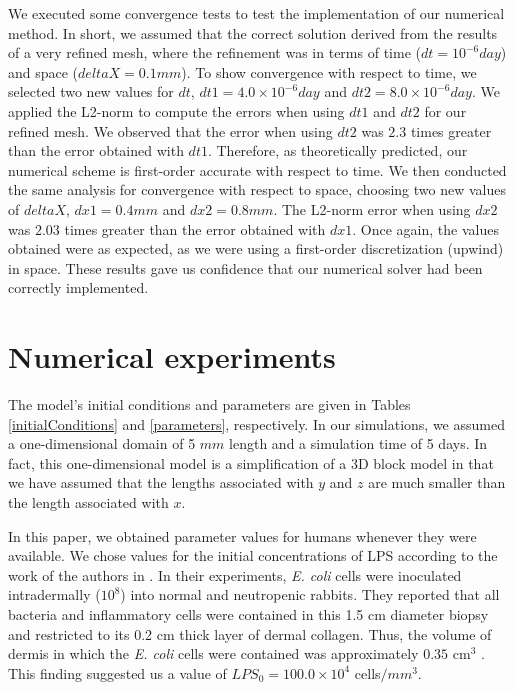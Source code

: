 \documentclass[10pt]{bmc_article}
\newenvironment{bmcformat}{\baselineskip20pt\sloppy\setboolean{publ}{false}}{\baselineskip20pt\sloppy}
\begin{document}
\begin{bmcformat}
We executed some convergence tests to test the implementation of our numerical method. 
In short, we assumed that the correct solution derived from the results of a very refined mesh, where the refinement was in terms of 
time ($dt = 10^{-6} day$) and space ($deltaX = 0.1 mm$). To show convergence with respect to time, we selected two new values for 
$dt$, $dt1 = 4.0 \times 10^{-6} day$ and $dt2 = 8.0 \times 10^{-6} day$. We applied the L2-norm to compute the errors when using 
$dt1$ and $dt2$ for our refined mesh. We observed that the error when using $dt2$ was $2.3$ times greater than the error obtained 
with $dt1$. Therefore, as theoretically predicted, our numerical scheme is first-order accurate with respect to time. We then conducted 
the same analysis for convergence with respect to space, choosing two new values of $deltaX$, $dx1 = 0.4 mm$ and $dx2 = 0.8 mm$. 
The L2-norm error when using $dx2$ was $2.03$ times greater than the error obtained with $dx1$. Once again, the values obtained were 
as expected, as we were using a first-order discretization (upwind) in space. These results gave us confidence that our numerical 
solver had been correctly implemented.


\section*{Numerical experiments}\label{results}

The model's initial conditions and parameters are given in Tables \ref{initialConditions} and \ref{parameters}, respectively. 
In our simulations, we assumed a one-dimensional domain of 5 $mm$ length and a simulation time of 5 days. 
In fact, this one-dimensional model is a simplification of a 3D block model in that we have assumed that the lengths associated 
with $y$ and $z$ are much smaller than the length associated with $x$.

In this paper, we obtained parameter values for humans whenever they were available. 
 We chose values for the initial concentrations of LPS according to the work of the authors in \cite{Movat1986}. 
In their experiments, \textit{E. coli} cells were inoculated intradermally ($10^8$) into normal and neutropenic rabbits. 
They reported that all bacteria and inflammatory cells were contained in this 1.5 cm diameter biopsy and restricted to its 0.2 cm 
thick layer of dermal collagen. Thus, the volume of dermis in which the \textit{E. coli} cells were contained was approximately 
$0.35$ cm$^3$ \cite{Li2004}. This finding suggested us a value of $LPS_0 = 100.0 \times 10^4$ cells$/mm^3$. 


\end{bmcformat}
\end{document}
